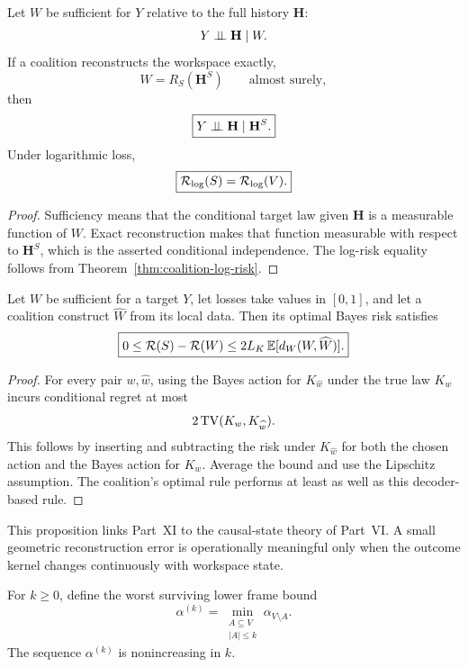 \begin{proposition}
\label{prop:exact-reconstruction-sufficiency}
Let \(W\) be sufficient for \(Y\) relative to the full history \(\mathbf H\):
\[
Y\perp\!\!\!\perp\mathbf H\mid W.
\]
If a coalition reconstructs the workspace exactly,
\[
W=R_S(\mathbf H^S)
\qquad\text{almost surely},
\]
then
\[
\boxed{
Y\perp\!\!\!\perp\mathbf H\mid\mathbf H^S.
}
\]
Under logarithmic loss,
\[
\boxed{
\mathcal R_{\log}(S)=\mathcal R_{\log}(V).
}
\]
\end{proposition}

\begin{proof}
Sufficiency means that the conditional target law given \(\mathbf H\) is a
measurable function of \(W\). Exact reconstruction makes that function
measurable with respect to \(\mathbf H^S\), which is the asserted conditional
independence. The log-risk equality follows from
Theorem~\ref{thm:coalition-log-risk}.
\end{proof}

\begin{proposition}\label{prop:reconstruction-risk-transfer}
Let \(W\) be sufficient for a target \(Y\), let losses take values in
\([0,1]\), and let a coalition construct \(\widehat W\) from its local data.
Then its optimal Bayes risk satisfies
\[
\boxed{
0\leq
\mathcal R(S)-\mathcal R(W)
\leq
2L_K\,\mathbb E[d_W(W,\widehat W)].
}
\]
\end{proposition}

\begin{proof}
For every pair \(w,\widehat w\), using the Bayes action for
\(K_{\widehat w}\) under the true law \(K_w\) incurs conditional regret at
most
\[
2\operatorname{TV}(K_w,K_{\widehat w}).
\]
This follows by inserting and subtracting the risk under
\(K_{\widehat w}\) for both the chosen action and the Bayes action for
\(K_w\). Average the bound and use the Lipschitz assumption. The coalition's
optimal rule performs at least as well as this decoder-based rule.
\end{proof}

This proposition links Part~XI to the causal-state theory of Part~VI. A small
geometric reconstruction error is operationally meaningful only when the
outcome kernel changes continuously with workspace state.


For \(k\geq0\), define the worst surviving lower frame bound
\[
\boxed{
\alpha^{(k)}
=
\min_{\substack{A\subseteq V\\|A|\leq k}}
\alpha_{V\setminus A}.
}
\]
The sequence \(\alpha^{(k)}\) is nonincreasing in \(k\).

